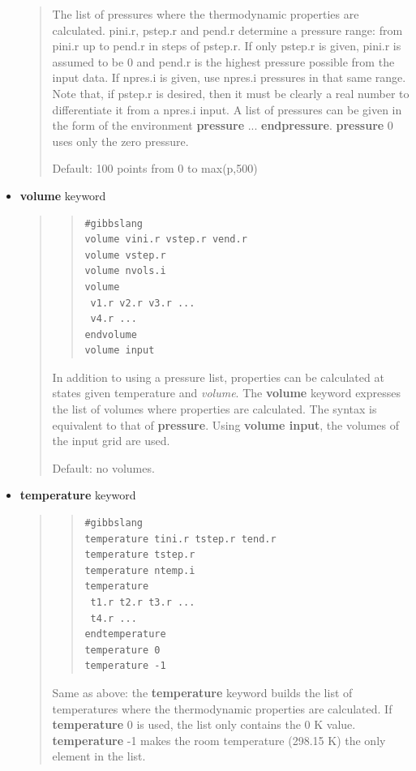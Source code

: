 \documentclass[a4paper]{article}
\begin{document}
\begin{itemize}
\begin{quote}
The list of pressures where the thermodynamic properties are
calculated. pini.r, pstep.r and pend.r determine a pressure
range: from pini.r up to pend.r in steps of pstep.r. If only
pstep.r is given, pini.r is assumed to be 0 and pend.r is the
highest pressure possible from the input data. If npres.i is given,
use npres.i pressures in that same range. Note that, if pstep.r
is desired, then it must be clearly a real number to differentiate
it from a npres.i input. A list of pressures
can be given in the form of the environment \textbf{pressure}
... \textbf{endpressure}. \textbf{pressure} 0 uses only the zero pressure.

Default: 100 points from 0 to max(p,500)
\end{quote}

\item \textbf{volume} keyword

\begin{quote}
\begin{quote}
\begin{verbatim}
#gibbslang
volume vini.r vstep.r vend.r
volume vstep.r
volume nvols.i
volume
 v1.r v2.r v3.r ...
 v4.r ...
endvolume
volume input
\end{verbatim}
\end{quote}

In addition to using a pressure list, properties can be calculated
at states given temperature and \emph{volume}. The \textbf{volume} keyword
expresses the list of volumes where properties are calculated. The
syntax is equivalent to that of \textbf{pressure}. Using \textbf{volume
input}, the volumes of the input grid are used.

Default: no volumes.
\end{quote}

\item \textbf{temperature} keyword

\begin{quote}
\begin{quote}
\begin{verbatim}
#gibbslang
temperature tini.r tstep.r tend.r
temperature tstep.r
temperature ntemp.i
temperature
 t1.r t2.r t3.r ...
 t4.r ...
endtemperature
temperature 0
temperature -1
\end{verbatim}
\end{quote}

Same as above: the \textbf{temperature} keyword builds the list of
temperatures where the thermodynamic properties are calculated. If
\textbf{temperature} 0 is used, the list only contains the 0 K
value. \textbf{temperature} -1 makes the room temperature (298.15 K) the
only element in the list.


\end{quote}
\end{itemize}
\end{document}
